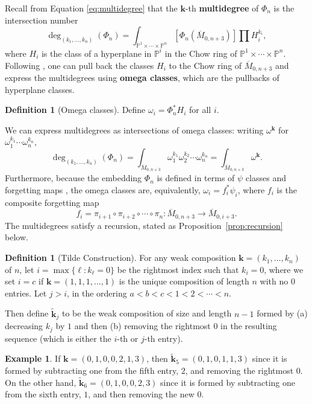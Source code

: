 \documentclass[11pt]{amsart}
\newcommand{\Mbar}{\overline{M}}
\newcommand{\PP}{\mathbb{P}}
\newcommand{\emb}{\Phi}
\numberwithin{thm}{section}
\numberwithin{equation}{section}
\numberwithin{figure}{section}
\theoremstyle{definition}
\newtheorem{example}[thm]{Example}
\newtheorem{definition}[thm]{Definition}
\begin{document}
Recall from Equation \ref{eq:multidegree} that the $\mathbf{k}$-th \textbf{multidegree} of $\emb_n$ is the intersection number  $$\deg_{(k_1,\ldots,k_n)}(\emb_n)=\int_{\PP^1\times \cdots \times \PP^n}[\emb_n(\Mbar_{0,n+3})]\prod H_i^{k_i},$$ where $H_i$ is the class of a hyperplane in $\PP^i$ in the Chow ring of $\PP^1\times \cdots \times \PP^n$. Following \cite{CGM}, one can pull back the classes $H_i$ to the Chow ring of $\Mbar_{0,n+3}$ and express the multidegrees using \textbf{omega classes}, which are the pullbacks of hyperplane classes.


\begin{definition}[Omega classes]
Define $\omega_i=\emb_n^\ast H_i$ for all $i$.
\end{definition}

We can express multidegrees as intersections of omega classes: writing $\omega^\mathbf{k}$ for $\omega_1^{k_1} \cdots \omega_n^{k_n}$,
\[
\deg_{(k_1,\ldots,k_n)}(\emb_n)=\int_{\Mbar_{0,n+3}}\omega_1^{k_1}\omega_2^{k_2}\cdots \omega_n^{k_n} = \int_{\Mbar_{0,n+3}} \omega^\mathbf{k}.
\]
Furthermore, because the embedding $\emb_n$ is defined in terms of $\psi$ classes and forgetting maps \cite{CGM}, the omega classes are, equivalently, $\omega_i=f_i^\ast \psi_i$, where $f_i$ is the composite forgetting map \[f_i=\pi_{i+1}\circ \pi_{i+2} \circ \cdots \circ \pi_n:\Mbar_{0,n+3}\to \Mbar_{0,i+3}.\]
The multidegrees satisfy a recursion, stated as Proposition~\ref{prop:recursion} below.

\begin{definition}[Tilde Construction] \label{def:ktilde-j}
For any weak composition $\mathbf{k}=(k_1,\ldots,k_n)$ of $n$, let $i=\max\{\ell: k_\ell=0\}$ be the rightmost index such that $k_i=0$, where we set $i=c$ if $\mathbf{k}=(1,1,1,\ldots,1)$ is the unique composition of length $n$ with no $0$ entries. Let $j>i$, in the ordering $a<b<c<1<2<\cdots<n$.  

Then define $\widetilde{\mathbf{k}}_j$ to be the weak composition of size and length $n-1$ formed by (a) decreasing $k_j$ by $1$ and then (b) removing the rightmost $0$ in the resulting sequence (which is either the $i$-th or $j$-th entry).
\end{definition}


\begin{example}
 If $\mathbf{k}=(0,1,0,0,2,1,3)$, then $\widetilde{\mathbf{k}}_5=(0,1,0,1,1,3)$ since it is formed by subtracting one from the fifth entry, $2$, and removing the rightmost $0$.  On the other hand, $\widetilde{\mathbf{k}}_6=(0,1,0,0,2,3)$ since it is formed by subtracting one from the sixth entry, $1$, and then removing the new $0$.
\end{example}
\end{document}
